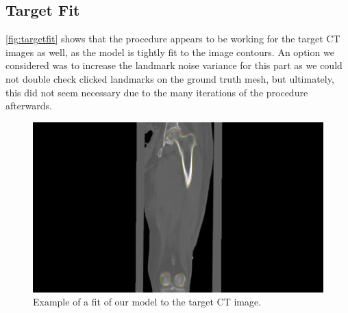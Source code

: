 
\subsection{Target Fit}
\label{subsec:targetfit}

\autoref{fig:targetfit} shows that the procedure appears to be working for the target CT images as well, as the model is tightly fit to the image contours. An option we considered was to increase the landmark noise variance for this part as we could not double check clicked landmarks on the ground truth mesh, but ultimately, this did not seem necessary due to the many iterations of the procedure afterwards.

\begin{figure}
	\centering
  \includegraphics[width=\columnwidth]{./Figures/local_minimum_y-axis}
  \caption{
    Example of a fit of our model to the target CT image. }
  \label{fig:targetfit}
\end{figure}




